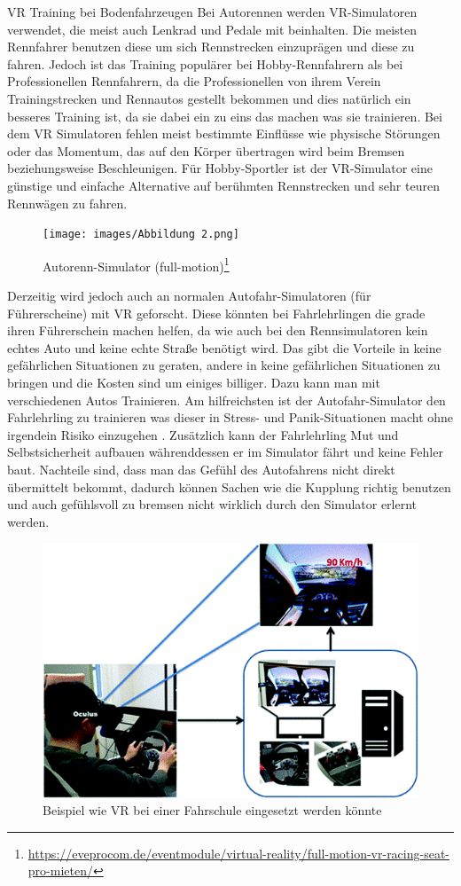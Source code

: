 VR Training bei Bodenfahrzeugen
Bei Autorennen werden VR-Simulatoren verwendet, die meist auch Lenkrad und Pedale mit beinhalten. Die meisten Rennfahrer benutzen diese um sich Rennstrecken einzuprägen und diese zu fahren. Jedoch ist das Training populärer bei Hobby-Rennfahrern als bei Professionellen Rennfahrern, da die Professionellen von ihrem Verein Trainingstrecken und Rennautos gestellt bekommen und dies natürlich ein besseres Training ist, da sie dabei ein zu eins das machen was sie trainieren. Bei dem VR Simulatoren fehlen meist bestimmte Einflüsse wie physische Störungen oder das Momentum, das auf den Körper übertragen wird beim Bremsen beziehungsweise Beschleunigen. Für Hobby-Sportler ist der VR-Simulator eine günstige und einfache Alternative auf berühmten Rennstrecken und sehr teuren Rennwägen zu fahren. 
\begin{figure}[!ht]
    \centering
    \texttt{[image: images/Abbildung 2.png]}
    \caption{\label{fig:Abbildung 2}Autorenn-Simulator (full-motion)\footnote{\url{https://eveprocom.de/eventmodule/virtual-reality/full-motion-vr-racing-seat-pro-mieten/}}\protect
    }
\end{figure}
Derzeitig wird jedoch auch an normalen Autofahr-Simulatoren (für Führerscheine) mit VR geforscht. Diese könnten bei Fahrlehrlingen die grade ihren Führerschein machen helfen, da wie auch bei den Rennsimulatoren kein echtes Auto und keine echte Straße benötigt wird. Das gibt die Vorteile in keine gefährlichen Situationen zu geraten, andere in keine gefährlichen Situationen zu bringen und die Kosten sind um einiges billiger. Dazu kann man mit verschiedenen Autos Trainieren. Am hilfreichsten ist der Autofahr-Simulator den Fahrlehrling zu trainieren was dieser in Stress- und Panik-Situationen macht ohne irgendein Risiko einzugehen \cite{ihemedu2017virtual}. Zusätzlich kann der Fahrlehrling Mut und Selbstsicherheit aufbauen währenddessen er im Simulator fährt und keine Fehler baut. Nachteile sind, dass man das Gefühl des Autofahrens nicht direkt übermittelt bekommt, dadurch können Sachen wie die Kupplung richtig benutzen und auch gefühlsvoll zu bremsen nicht wirklich durch den Simulator erlernt werden.
\begin{figure}[!ht]
    \centering
    \includegraphics[width=1.0\textwidth]{images/Abbildung 3.png}
    \caption{\label{fig:Abbildung 3}Beispiel wie VR bei einer Fahrschule eingesetzt werden könnte\cite{ihemedu2017virtual}\protect
    }
\end{figure}
